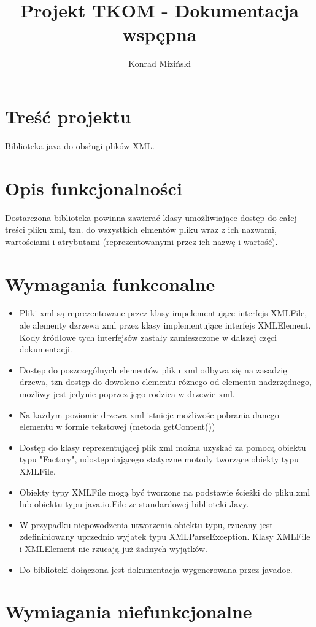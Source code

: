 \documentclass{article}
\author{Konrad Miziński}
\title{Projekt TKOM - Dokumentacja wspępna}
\begin{document}
\maketitle

\section{Treść projektu}
Biblioteka java do obsługi plików XML.

\section{Opis funkcjonalności}
Dostarczona biblioteka powinna zawierać klasy umożliwiające dostęp do całej treści pliku xml,
tzn. do wszystkich elmentów pliku wraz z ich nazwami, wartościami i atrybutami (reprezentowanymi przez ich nazwę i wartość).

\section{Wymagania funkconalne}
\begin{itemize}
	\item Pliki xml są reprezentowane przez klasy impelementujące interfejs XMLFile,
	ale alementy dzrzewa xml przez klasy implementujące interfejs XMLElement.
	Kody źródłowe tych interfejsów zastały zamieszczone w dalszej częci dokumentacji.
	\item Dostęp do poszczególnych elementów pliku xml odbywa się na zasadzię drzewa,
	tzn dostęp do dowoleno elementu różnego od elementu nadzrzędnego,
	możliwy jest jedynie poprzez jego rodzica w drzewie xml.
	\item Na każdym poziomie drzewa xml istnieje możliwośc pobrania danego elementu w formie tekstowej
	(metoda getContent())
	\item Dostęp do klasy reprezentującej plik xml można uzyskać za pomocą obiektu typu "Factory",
	udostępniającego statyczne motody tworzące obiekty typu XMLFile.
	\item Obiekty typy XMLFile mogą być tworzone na podstawie ścieżki do pliku.xml
	lub obiektu typu java.io.File ze standardowej biblioteki Javy.
	\item W przypadku niepowodzenia utworzenia obiektu typu, rzucany jest zdefininiowany uprzednio
	wyjatek typu XMLParseException. Klasy XMLFile i XMLElement nie rzucają już żadnych wyjątków.
	\item Do biblioteki dołączona jest dokumentacja wygenerowana przez javadoc.	
\end{itemize}

\section{Wymiagania niefunkcjonalne}
\end{document}
